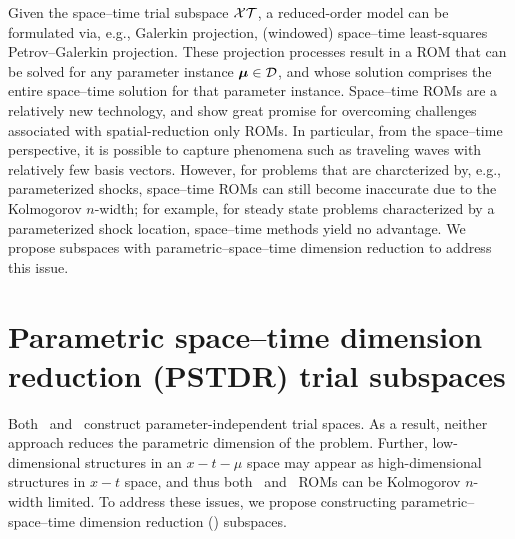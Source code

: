 \documentclass[3p,computermodern,10pt]{elsarticle}
\begin{document}
Given the space--time trial subspace $\mathcal{XT}$, a reduced-order model can be formulated via, e.g., Galerkin projection, (windowed) space--time least-squares Petrov--Galerkin projection. These projection processes result in a ROM that can be solved for any parameter instance $\boldsymbol \mu \in \mathcal{D}$, and whose solution comprises the entire space--time solution for that parameter instance. Space--time ROMs are a relatively new technology, and show great promise for overcoming challenges associated with spatial-reduction only ROMs. In particular, from the space--time perspective, it is possible to capture phenomena such as traveling waves with relatively few basis vectors. However, for problems that are charcterized by, e.g., parameterized shocks, space--time ROMs can still become inaccurate due to the Kolmogorov $n$-width; for example, for steady state problems characterized by a parameterized shock location, space--time methods yield no advantage. We propose subspaces with parametric--space--time dimension reduction to address this issue.




\section{Parametric space--time dimension reduction (PSTDR) trial subspaces}\label{sec:PSTDRspaces}
Both \spatialAcronym\ and \spaceTimeAcronym\ construct parameter-independent trial spaces. As a result, neither approach reduces the parametric dimension of the problem. Further, low-dimensional structures in an $x-t-\mu$ space may appear as high-dimensional structures in $x-t$ space, and thus both \spatialAcronym\ and \spaceTimeAcronym\ ROMs can be Kolmogorov $n$-width limited. To address these issues, we propose constructing parametric--space--time dimension reduction (\parametricSpaceTimeAcronym) subspaces. 
\end{document}
